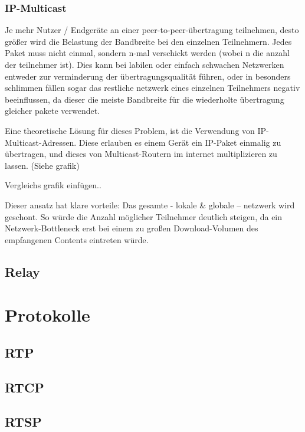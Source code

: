 \documentclass{IEEEtran}
\begin{document}
\begin{twocolumn}

\subsubsection{IP-Multicast}

Je mehr Nutzer / Endgeräte an einer peer-to-peer-übertragung teilnehmen, desto
größer wird die Belastung der Bandbreite bei den einzelnen Teilnehmern. Jedes
Paket muss nicht einmal, sondern n-mal verschickt werden (wobei n die anzahl
der teilnehmer ist). Dies kann bei labilen oder einfach schwachen Netzwerken
entweder zur verminderung der übertragungsqualität führen, oder in besonders
schlimmen fällen sogar das restliche netzwerk eines einzelnen Teilnehmers
negativ beeinflussen, da dieser die meiste Bandbreite für die wiederholte
übertragung gleicher pakete verwendet.

Eine theoretische Lösung für dieses Problem, ist die Verwendung von
IP-Multicast-Adressen. Diese erlauben es einem Gerät ein IP-Paket einmalig zu
übertragen, und dieses von Multicast-Routern im internet multiplizieren zu
lassen. (Siehe grafik)

Vergleichs grafik einfügen..

Dieser ansatz hat klare vorteile: Das gesamte - lokale \& globale – netzwerk
wird geschont. So würde die Anzahl möglicher Teilnehmer deutlich steigen, da
ein Netzwerk-Bottleneck erst bei einem zu großen Download-Volumen des
empfangenen Contents eintreten würde.

\subsection{Relay}

\section{Protokolle}
\subsection{RTP}

\subsection{RTCP}
\subsection{RTSP}

\end{twocolumn}
\end{document}
